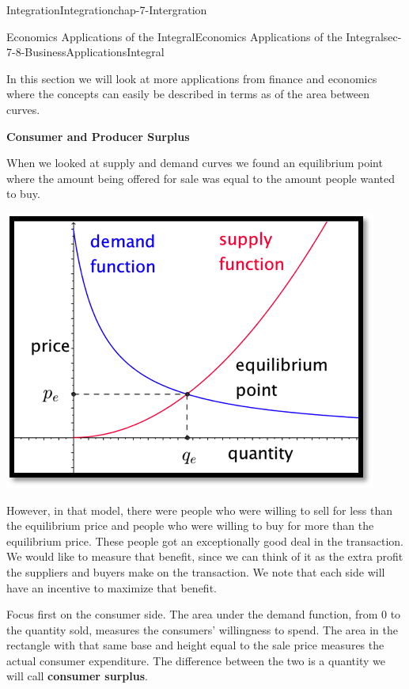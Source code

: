 \documentclass[oneside,10pt,]{book}
\newcommand{\terminology}[1]{\textbf{#1}}
\numberwithin{equation}{section}
\begin{document}
\begin{chapterptx}{Integration}{}{Integration}{}{}{chap-7-Intergration}
\begin{sectionptx}{Economics Applications of the Integral}{}{Economics Applications of the Integral}{}{}{sec-7-8-BusinessApplicationsIntegral}
\par
\hypertarget{p-3070}{}%
In this section we will look at more applications from finance and economics where the concepts can easily be described in terms as of the area between curves.%
\par
\hypertarget{p-3071}{}%
\terminology{Consumer and Producer Surplus}%
\par
\hypertarget{p-3072}{}%
When we looked at supply and demand curves we found an equilibrium point where the amount being offered for sale was equal to the amount people wanted to buy.%
\begin{sidebyside}{1}{0.25}{0.25}{0}%
\begin{sbspanel}{0.5}%
\includegraphics[width=1\linewidth]{images/sec7-8-1.png}
\end{sbspanel}%
\end{sidebyside}%
\par
\hypertarget{p-3073}{}%
However, in that model, there were people who were willing to sell for less than the equilibrium price and people who were willing to buy for more than the equilibrium price.  These people got an exceptionally good deal in the transaction.  We would like to measure that benefit, since we can think of it as the extra profit the suppliers and buyers make on the transaction.  We note that each side will have an incentive to maximize that benefit.%
\par
\hypertarget{p-3074}{}%
Focus first on the consumer side.  The area under the demand function, from 0 to the quantity sold, measures the consumers’ willingness to spend.  The area in the rectangle with that same base and height equal to the sale price measures the actual consumer expenditure.  The difference between the two is a quantity we will call \terminology{consumer surplus}.%

\end{sectionptx}
\end{chapterptx}
\end{document}
